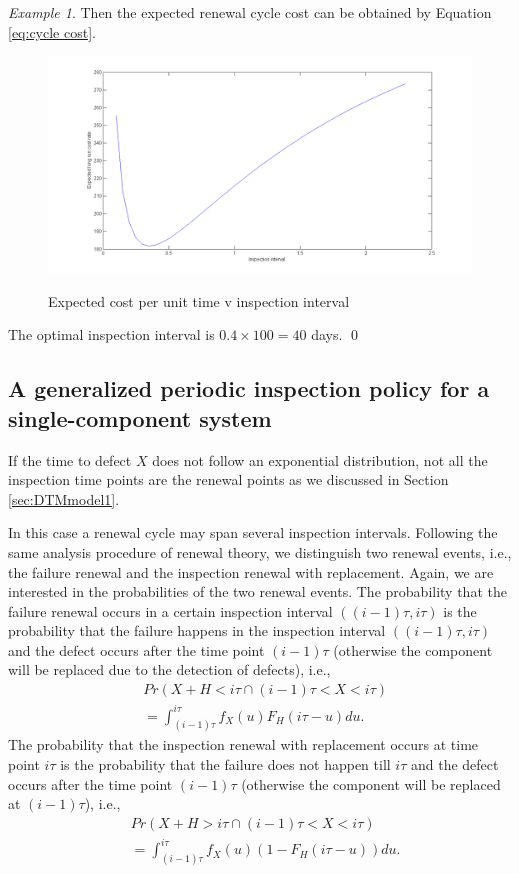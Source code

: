 \documentclass[10pt,a4paper]{article}
\theoremstyle{remark}
\newtheorem{example}{Example}
\begin{document}
\begin{example}
Then the expected renewal cycle cost can be obtained by Equation \ref{eq:cycle cost}.

\begin{figure}[h!!!]  %
  \centering
  \includegraphics[width=6in]{example1.png}\\
  \footnotesize
  \caption{ \footnotesize{Expected cost per unit time v inspection interval} }\label{pic:example1}
\end{figure}

The optimal inspection interval is $0.4 \times 100=40$ days. 
\qed
\end{example}

\subsection{A generalized periodic inspection policy for a single-component system}

If the time to defect $X$ does not follow an exponential distribution, not all the inspection time points are the renewal points as we discussed in Section \ref{sec:DTMmodel1}. 

In this case a renewal cycle may span several inspection intervals. Following the same analysis procedure of renewal theory, we distinguish two renewal events, i.e., the failure renewal and the inspection renewal with replacement. Again, we are interested in the probabilities of the two renewal events. The probability that the failure renewal occurs in a certain inspection interval $((i-1)\tau,i\tau)$ is the probability that the failure happens in the inspection interval $((i-1)\tau,i\tau)$ and the defect occurs after the time point $(i-1)\tau$ (otherwise the component will be replaced due to the detection of defects), i.e.,
\begin{align*}
& Pr(X+H<i\tau \cap (i-1)\tau<X<i\tau ) \nonumber \\
& = \int_{(i-1)\tau}^{i\tau} f_{X}(u) F_{H}(i\tau-u)du. 
\end{align*} 
The probability that the inspection renewal with replacement occurs at time point $i\tau$ is the probability that the failure does not happen till $i\tau$ and the defect occurs after the time point $(i-1)\tau$ (otherwise the component will be replaced at $(i-1)\tau$), i.e.,
\begin{align*}
& Pr(X+H>i\tau \cap (i-1)\tau<X<i\tau ) \nonumber \\
& = \int_{(i-1)\tau}^{i\tau} f_{X}(u) (1-F_{H}(i\tau-u))du. 
\end{align*} 
\end{document}
